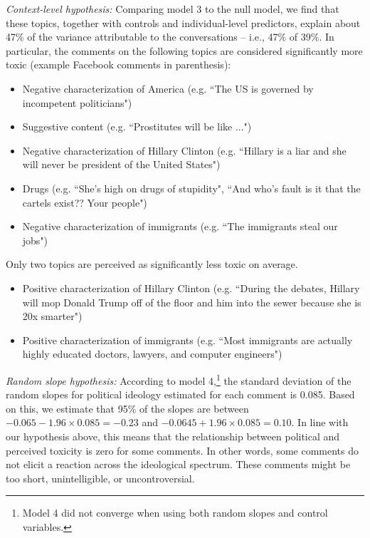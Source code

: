 \documentclass{article}
\begin{document}
\textit{Context-level hypothesis:} Comparing model 3 to the null model, we find that these topics, together with controls and individual-level predictors, explain about 47\% of the variance attributable to the conversations -- i.e., 47\% of 39\%. In particular, the comments on the following topics are considered significantly more toxic (example Facebook comments in parenthesis): 
\begin{itemize}
    \item Negative characterization of America (e.g. ``The US is governed by incompetent politicians")
    \item Suggestive content (e.g. ``Prostitutes will be like ...")
    \item Negative characterization of Hillary Clinton (e.g. ``Hillary is a liar and she will never be president of the United States")
    \item Drugs (e.g. ``She's high on drugs of stupidity", ``And who's fault is it that the cartels exist?? Your people")
    \item Negative characterization of immigrants (e.g. ``The immigrants steal our jobs")
\end{itemize}

Only two topics are perceived as significantly less toxic on average.

\begin{itemize}
    \item Positive characterization of Hillary Clinton (e.g. ``During the debates, Hillary will mop Donald Trump off of the floor and him into the sewer because she is 20x smarter")
    \item Positive characterization of immigrants (e.g. ``Most immigrants are actually highly educated doctors, lawyers, and computer engineers")
\end{itemize}



\textit{Random slope hypothesis:} According to model 4,\footnote{Model 4 did not converge when using both random slopes and control variables.} the standard deviation of the random slopes for political ideology estimated for each comment is 0.085. Based on this, we estimate that 95\% of the slopes are between $-0.065 - 1.96\times 0.085=-0.23$ and  $-0.0645 + 1.96 \times 0.085=0.10$. In line with our hypothesis above, this means that the relationship between political and perceived toxicity is zero for some comments. In other words, some comments do not elicit a reaction across the ideological spectrum. These comments might be too short, unintelligible, or uncontroversial.
\end{document}
